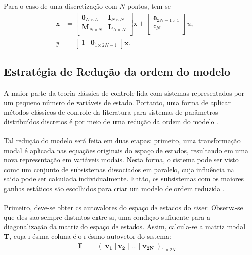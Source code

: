  Para o caso de uma discretização com $N$ pontos, tem-se \begin{align}
 	\mathbf{\dot{x}} &= \left[\begin{array}{cc}
	\mathbf{0}_{N\times N} & \mathbf{I}_{N\times N}\\
	\mathbf{M}_{N\times N} & \mathbf{L}_{N\times N}\\
\end{array}\right] \mathbf{x} + \left[\begin{array}{c}
	\mathbf{0}_{2N-1\times 1}\\ e_N\\
\end{array} \right]u,\;\;\\
y &= \left[\begin{array}{cc}
	1 & \textbf{0}_{1\times 2N-1}
\end{array}\right]\textbf{x}.
 \end{align}


\subsection{Estratégia de Redução da ordem do modelo}

\paragraph{} A maior parte da teoria clássica de controle lida com sistemas representados por um pequeno número de variáveis de estado. Portanto, uma forma de aplicar métodos clássicos de controle da literatura para sistemas de parâmetros distribuídos discretos é por meio de uma redução da ordem do modelo \cite{fabricioIFAC}.

\paragraph{} Tal redução do modelo será feita em duas etapas: primeiro, uma transformação modal é aplicada nas equações originais do espaço de estados, resultando em uma nova representação em variáveis modais. Nesta forma, o sistema pode ser visto como um conjunto de subsistemas dissociados em paralelo, cuja influência na saída pode ser calculada individualmente. Então, os subsistemas com os maiores ganhos estáticos são escolhidos para criar um modelo de ordem reduzida \cite{fabricioIFAC}.

\paragraph{} Primeiro, deve-se obter os autovalores do espaço de estados do \textit{riser}. Observa-se que eles são sempre distintos entre si, uma condição suficiente para a diagonalização da matriz do espaço de estados. Assim, calcula-se a matriz modal \textbf{T}, cuja i-ésima coluna é o i-ésimo autovetor do sistema: \begin{align}
	\mathbf{T} &= \left(\;\mathbf{v_1}\;|\;\mathbf{v_2}\;|\;\ldots\;|\;\mathbf{v_{2N}}\;\right)_{1\times 2N}
\end{align}

